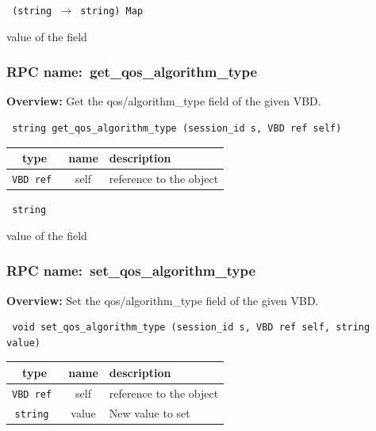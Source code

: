 \vspace{0.3cm}

{\tt 
(string $\rightarrow$ string) Map
}


value of the field
\vspace{0.3cm}
\vspace{0.3cm}
\vspace{0.3cm}
\subsubsection{RPC name:~get\_qos\_algorithm\_type}

{\bf Overview:} 
Get the qos/algorithm\_type field of the given VBD.

\begin{verbatim} string get_qos_algorithm_type (session_id s, VBD ref self)\end{verbatim}



 
\vspace{0.3cm}
\begin{tabular}{|c|c|p{7cm}|}
 \hline
{\bf type} & {\bf name} & {\bf description} \\ \hline
{\tt VBD ref } & self & reference to the object \\ \hline 

\end{tabular}

\vspace{0.3cm}

{\tt 
string
}


value of the field
\vspace{0.3cm}
\vspace{0.3cm}
\vspace{0.3cm}
\subsubsection{RPC name:~set\_qos\_algorithm\_type}

{\bf Overview:} 
Set the qos/algorithm\_type field of the given VBD.

\begin{verbatim} void set_qos_algorithm_type (session_id s, VBD ref self, string value)\end{verbatim}



 
\vspace{0.3cm}
\begin{tabular}{|c|c|p{7cm}|}
 \hline
{\bf type} & {\bf name} & {\bf description} \\ \hline
{\tt VBD ref } & self & reference to the object \\ \hline 

{\tt string } & value & New value to set \\ \hline 

\end{tabular}

